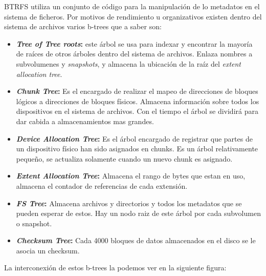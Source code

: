 BTRFS utiliza un conjunto de código para la manipulación de lo metadatos en el sistema de ficheros. Por motivos de rendimiento u organizativos existen dentro del sistema de archivos varios b-trees que a saber son:
\begin{itemize}
    \item \textbf{\textit{Tree of Tree roots}:} este árbol se usa para indexar  y encontrar la mayoría de raíces de otros árboles dentro del sistema de archivos. Enlaza nombres a subvolumenes y \textit{snapshots}, y almacena la ubicación de la raíz del \textit{extent allocation tree}. 
    \item \textbf{\textit{Chunk Tree}:} Es el encargado de realizar el mapeo de direcciones de bloques lógicos a direcciones de bloques físicos. Almacena información sobre todos los dispositivos en el sistema de archivos. Con el tiempo el árbol se dividirá para dar cabida a almacenamientos mas grandes.
    \item \textbf{\textit{Device Allocation Tree}:} Es el árbol encargado de registrar que partes de un dispositivo físico han sido asignados en chunks. Es un árbol relativamente pequeño, se actualiza solamente cuando un nuevo chunk es asignado. 
    \item \textbf{\textit{Extent Allocation Tree}:} Almacena el rango de bytes que estan en uso, almacena el contador de referencias de cada extensión.
    \item \textbf{\textit{FS Tree}:} Almacena archivos y directorios y todos los metadatos que se pueden esperar de estos. Hay un nodo raiz de este árbol por cada subvolumen o snapshot.
    \item \textbf{\textit{Checksum Tree}:} Cada 4000 bloques de datos almacenados en el disco se le asocia un checksum.
\end{itemize}
\newpage
La interconexión de estos b-trees la podemos ver en la siguiente figura: 

